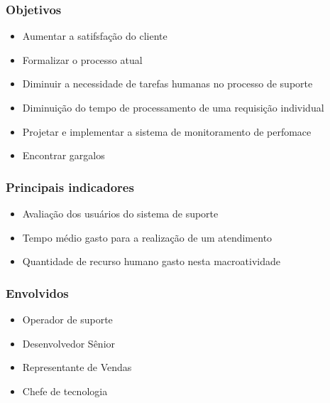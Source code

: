 \subsubsection{Objetivos}
\begin{itemize}[noitemsep]
 \item Aumentar a satifsfação do cliente
 \item Formalizar o processo atual
 \item Diminuir a necessidade de tarefas humanas no processo de suporte
 \item Diminuição do tempo de processamento de uma requisição individual
 \item Projetar e implementar a sistema de monitoramento de perfomace
 \item Encontrar gargalos
\end{itemize}

\subsubsection{Principais indicadores}
\begin{itemize}[noitemsep]
 \item Avaliação dos usuários do sistema de suporte
 \item Tempo médio gasto para a realização de um atendimento
 \item Quantidade de recurso humano gasto nesta macroatividade
\end{itemize}

\subsubsection{Envolvidos}
\begin{itemize}[noitemsep]
 \item Operador de suporte
 \item Desenvolvedor Sênior
 \item Representante de Vendas
 \item Chefe de tecnologia
\end{itemize}
